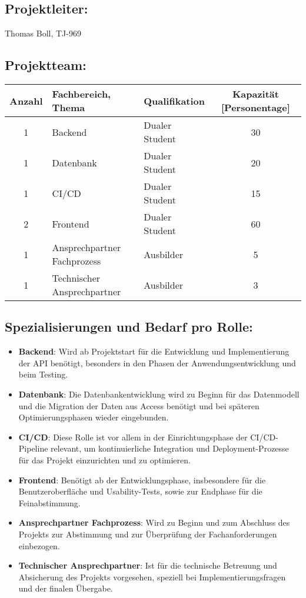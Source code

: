 \documentclass[a4paper, 12pt]{article}
\begin{document}
\subsection*{Projektleiter:} Thomas Boll, TJ-969
\subsection*{Projektteam:}

\setlength{\tabcolsep}{.2cm}
\renewcommand{\arraystretch}{1.5}
\begin{tabular}{|c|l|l|c|} \hline
\textbf{Anzahl} & \textbf{Fachbereich, Thema} & \textbf{Qualifikation} & \textbf{Kapazität [Personentage]} \\ \hline
1 & Backend & Dualer Student & 30 \\ \hline
1 & Datenbank & Dualer Student & 20 \\ \hline
1 & CI/CD & Dualer Student & 15 \\ \hline
2 & Frontend & Dualer Student & 60 \\ \hline
1 & Ansprechpartner Fachprozess & Ausbilder & 5 \\ \hline
1 & Technischer Ansprechpartner & Ausbilder & 3 \\ \hline
\end{tabular}

\subsection*{Spezialisierungen und Bedarf pro Rolle:}
\begin{itemize}[itemsep=0cm]
    \item \textbf{Backend}: Wird ab Projektstart für die Entwicklung und Implementierung der API benötigt, besonders in den Phasen der Anwendungsentwicklung und beim Testing.
    \item \textbf{Datenbank}: Die Datenbankentwicklung wird zu Beginn für das Datenmodell und die Migration der Daten aus Access benötigt und bei späteren Optimierungsphasen wieder eingebunden.
    \item \textbf{CI/CD}: Diese Rolle ist vor allem in der Einrichtungsphase der CI/CD-Pipeline relevant, um kontinuierliche Integration und Deployment-Prozesse für das Projekt einzurichten und zu optimieren.
    \item \textbf{Frontend}: Benötigt ab der Entwicklungsphase, insbesondere für die Benutzeroberfläche und Usability-Tests, sowie zur Endphase für die Feinabstimmung.
    \item \textbf{Ansprechpartner Fachprozess}: Wird zu Beginn und zum Abschluss des Projekts zur Abstimmung und zur Überprüfung der Fachanforderungen einbezogen.
    \item \textbf{Technischer Ansprechpartner}: Ist für die technische Betreuung und Absicherung des Projekts vorgesehen, speziell bei Implementierungsfragen und der finalen Übergabe.
\end{itemize}
\end{document}
